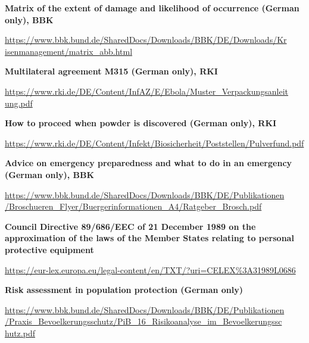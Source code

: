 \documentclass{article}
\begin{document}
\textbf{Matrix of the extent of damage and likelihood of occurrence (German only), BBK}


\href{https://www.bbk.bund.de/SharedDocs/Downloads/BBK/DE/Downloads/Krisenmanagement/matrix_abb.html}{https://www.bbk.bund.de/SharedDocs/Downloads/BBK/DE/Downloads/Kr} \href{https://www.bbk.bund.de/SharedDocs/Downloads/BBK/DE/Downloads/Krisenmanagement/matrix_abb.html}{isenmanagement/matrix\_abb.html}


\textbf{Multilateral agreement M315 (German only), RKI }


\href{https://www.rki.de/DE/Content/InfAZ/E/Ebola/Muster_Verpackungsanleitung.pdf?__blob=publicationFile}{https://www.rki.de/DE/Content/InfAZ/E/Ebola/Muster\_Verpackungsanleit} \href{https://www.rki.de/DE/Content/InfAZ/E/Ebola/Muster_Verpackungsanleitung.pdf?__blob=publicationFile}{ung.pdf} 


\textbf{How to proceed when powder is discovered (German only), RKI}


\href{https://www.rki.de/DE/Content/Infekt/Biosicherheit/Poststellen/Pulverfund.pdf}{https://www.rki.de/DE/Content/Infekt/Biosicherheit/Poststellen/Pulverfund.pdf}


\textbf{Advice on emergency preparedness and what to do in an emergency (German only), BBK}


\href{https://www.bbk.bund.de/SharedDocs/Downloads/BBK/DE/Publikationen/Broschueren_Flyer/Buergerinformationen_A4/Ratgeber_Brosch.pdf}{https://www.bbk.bund.de/SharedDocs/Downloads/BBK/DE/Publikationen} \href{https://www.bbk.bund.de/SharedDocs/Downloads/BBK/DE/Publikationen/Broschueren_Flyer/Buergerinformationen_A4/Ratgeber_Brosch.pdf}{/Broschueren\_Flyer/Buergerinformationen\_A4/Ratgeber\_Brosch.pdf}


\textbf{Council Directive 89/686/EEC of 21 December 1989 on the approximation of the laws of the Member States relating to personal protective equipment }


\href{https://eur-lex.europa.eu/legal-content/en/TXT/?uri=CELEX%3A31989L0686}{https://eur-lex.europa.eu/legal-content/en/TXT/?uri=CELEX\%3A31989L0686}


\textbf{Risk assessment in population protection (German only)} 


\href{https://www.bbk.bund.de/SharedDocs/Downloads/BBK/DE/Publikationen/Praxis_Bevoelkerungsschutz/PiB_16_Risikoanalyse_im_Bevoelkerungsschutz.pdf}{https://www.bbk.bund.de/SharedDocs/Downloads/BBK/DE/Publikationen} \href{https://www.bbk.bund.de/SharedDocs/Downloads/BBK/DE/Publikationen/Praxis_Bevoelkerungsschutz/PiB_16_Risikoanalyse_im_Bevoelkerungsschutz.pdf}{/Praxis\_Bevoelkerungsschutz/PiB\_16\_Risikoanalyse\_im\_Bevoelkerungssc} \href{https://www.bbk.bund.de/SharedDocs/Downloads/BBK/DE/Publikationen/Praxis_Bevoelkerungsschutz/PiB_16_Risikoanalyse_im_Bevoelkerungsschutz.pdf}{hutz.pdf}
\end{document}
